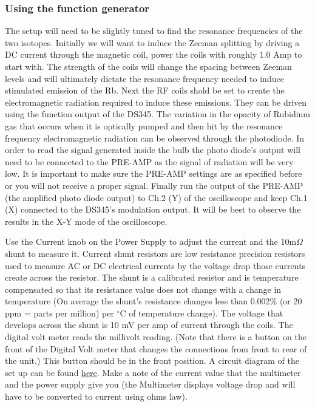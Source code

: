 \documentclass[11pt]{article}
\begin{document}
\subsubsection{Using the function generator}
The setup will need to be slightly tuned to find the resonance frequencies of the two isotopes. Initially we will want to induce the Zeeman splitting by driving a DC current through the magnetic coil, power the coils with roughly 1.0 Amp to start with. The strength of the coils will change the spacing between Zeeman levels and will ultimately dictate the resonance frequency needed to induce stimulated emission of the Rb. Next the RF coils shold be set to create the electromagnetic radiation required to induce these emissions. They can be driven using the function output of the DS345. The variation in the opacity of Rubidium gas that occurs when it is optically pumped and then hit by the resonance frequency electromagnetic radiation can be observed through the photodiode. In order to read the signal generated inside the bulb the photo diode's output will need to be connected to the PRE-AMP as the signal of radiation will be very low. It is important to make sure the PRE-AMP settings are as specified before or you will not receive a proper signal. Finally run the output of the PRE-AMP (the amplified photo diode output) to Ch.2 (Y) of the oscilloscope and keep Ch.1 (X) connected to the DS345's modulation output. It will be best to observe the results in the X-Y mode of the oscilloscope. 

Use the Current knob on the Power Supply to adjust the current and the 10m$\Omega$ shunt to measure it. Current shunt resistors are low resistance precision resistors used to measure AC or DC electrical currents by the voltage drop those currents create across the resistor. The shunt is a calibrated resistor and is temperature compensated so that its resistance value does not change with a change in temperature (On average the shunt's resistance changes less than 0.002\% (or 20 ppm = parts per million) per $^\circ$C of temperature change). The voltage that develops across the shunt is 10 mV per amp of current through the coils. The digital volt meter reads the millivolt reading. (Note that there is a button on the front of the Digital Volt meter that changes the connections from front to rear of the unit.) This button should be in the front position. A circuit diagram of the set up can be found \href{http://experimentationlab.berkeley.edu/sites/default/files/OPT/Circuitformagnetic%20coils.png}{here}.
Make a note of the current value that the multimeter and the power supply give you (the Multimeter displays voltage drop and will have to be converted to current using ohms law). 
\end{document}
